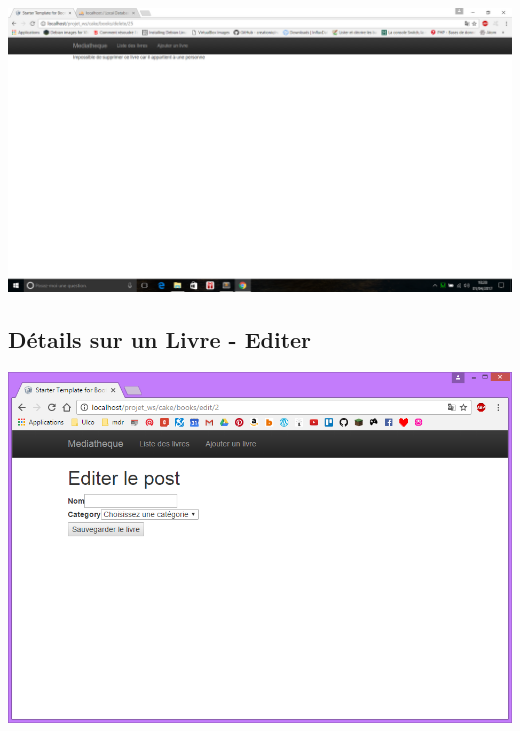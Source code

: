 \documentclass{report}
\begin{document}
			\begin{center}
				\includegraphics[scale=0.4]{img/manuel/DetailLivre_Supprimer_error.png}  
			\end{center}
			
			\subsection{D\'{e}tails sur un Livre - Editer}
			\begin{center}
				\includegraphics[scale=0.5]{img/manuel/DetailLivre_Editer.png}  
			\end{center}
			
\end{document}
